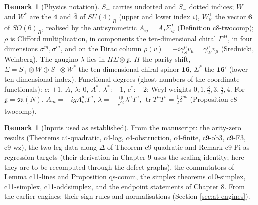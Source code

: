 \documentclass[11pt]{article}
\numberwithin{equation}{section}
\theoremstyle{plain}
\theoremstyle{definition}
\newtheorem{remark}[theorem]{Remark}
\begin{document}
\begin{remark}[Physics notation]
\label{rem:at-phys}
$S_+$ carries undotted and $S_-$ dotted indices; $W$ and $W^*$ are the $\mathbf 4$ and $\bar{\mathbf 4}$ of $SU(4)_R$ (upper and lower index $i$), $W^\perp_{\mathbb R}$ the vector $\mathbf 6$ of $SO(6)_R$, realised by the antisymmetric $A_{ij}=A_I\Sigma^I_{ij}$ (Definition c8-twocomp); $\rho$ is Clifford multiplication, in components the ten-dimensional chiral $\Gamma^M$, in four dimensions $\sigma^m,\bar\sigma^m$, and on the Dirac column $\rho(v)=-i\gamma_S^\mu v_\mu=\gamma_W^\mu v_\mu$ (Srednicki, Weinberg). The gaugino $\lambda$ lies in $\Pi\Sigma\otimes\mathfrak g$, $\Pi$ the parity shift, $\Sigma=S_+\otimes W\oplus S_-\otimes W^*$ the ten-dimensional chiral spinor $\mathbf{16}$, $\Sigma^*$ the $\mathbf{16}'$ (lower ten-dimensional index). Functional degrees (ghost numbers of the coordinate functionals): $c$: $+1$, $A$, $\lambda$: $0$, $A^*$, $\lambda^*$: $-1$, $c^*$: $-2$; Weyl weights $0,1,\tfrac32,3,\tfrac52,4$. For $\mathfrak g=\mathfrak{su}(N)$, $A_m=-igA^a_mT^a$, $\lambda=-\tfrac{ig}{\sqrt2}\lambda^aT^a$, $\operatorname{tr}T^aT^b=\tfrac12\delta^{ab}$ (Proposition c8-twocomp).
\end{remark}

\begin{remark}[Inputs used as established]
\label{rem:at-inputs}
From the manuscript: the arity-zero results (Theorems c4-quadratic, c4-log, c4-obstruction, c4-finite, c9-ob3, c9-F3, c9-wz), the two-leg data along $\Delta$ of Theorem c9-quadratic and Remark c9-Pi as regression targets (their derivation in Chapter 9 uses the scaling identity; here they are to be recomputed through the defect graphs), the commutators of Lemma c11-lines and Proposition qs-comm, the simplex theorems c10-simplex, c11-simplex, c11-oddsimplex, and the endpoint statements of Chapter 8. From the earlier engines: their sign rules and normalisations (Section \ref{sec:at-engines}).
\end{remark}
\end{document}
